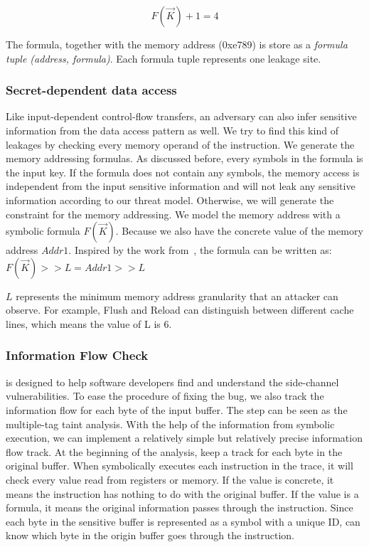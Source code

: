 $$F(\vec{K}) + 1 = 4$$

The formula, together with the memory address (0xe789) is store
as a \textit{formula tuple (address, formula)}. 
Each formula tuple represents one leakage site.

\subsubsection{Secret-dependent data access}
Like input-dependent control-flow transfers, an adversary can also infer 
sensitive information from the data access pattern as well. 
We try to find this kind of leakages by checking 
every memory operand of the instruction. We generate the memory addressing 
formulas. As discussed before, every symbols in the formula is the input key. 
If the formula does not contain any symbols, the memory access is independent 
from the input sensitive information and will not leak any sensitive information 
according to our threat model. Otherwise, we will generate the constraint for
the memory addressing. We model the memory address with a symbolic formula 
$F(\vec{K})$. 
Because we also have the concrete value of the memory address $Addr1$. 
Inspired by the work from~\cite{203878}, the formula can be written as:
$F(\vec{K}) >> L = Addr1 >> L$

$L$ represents the minimum memory address granularity that an attacker 
can observe. For example, Flush and Reload can distinguish between different
cache lines, which means the value of L is 6.

\subsubsection{Information Flow Check}
\tool{} is designed to help software developers find and understand the 
side-channel vulnerabilities. To ease the procedure of fixing the bug,
we also track the information flow for each byte of the input
buffer. 
The step can be seen as the multiple-tag taint analysis.
With the help of the information from symbolic execution, we can implement 
a relatively simple but relatively precise information flow track.
At the beginning of the analysis, \tool{} keep a track for each byte in 
the original buffer. When \tool{} symbolically executes each
instruction in the trace, it will check every value read from
registers or memory. If the value is concrete, it means the
instruction has nothing to do with the original buffer.
If the value is a formula, it means the original information passes through 
the instruction. Since each byte in the sensitive
buffer is represented as a symbol with a unique ID, \tool{} can
know which byte in the origin buffer goes through the
instruction.


